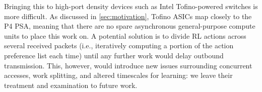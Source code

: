 \documentclass[sigconf,natbib=false]{acmart}
\begin{document}
Bringing this to high-port density devices such as Intel Tofino-powered switches is more difficult.
As discussed in \cref{sec:motivation}, Tofino ASICs map closely to the P4 PSA, meaning that there are no spare asynchronous general-purpose compute units to place this work on.
A potential solution is to divide RL actions across several received packets (i.e., iteratively computing a portion of the action preference list each time) until any further work would delay outbound transmission.
This, however, would introduce new issues surrounding concurrent accesses, work splitting, and altered timescales for learning: we leave their treatment and examination to future work.

%		
%		
%		
%		
\end{document}
